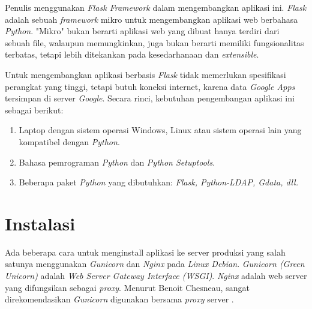 Penulis menggunakan \textit{Flask Framework} dalam mengembangkan aplikasi ini. \textit{Flask} adalah sebuah \textit{framework} mikro untuk mengembangkan aplikasi web berbahasa \textit{Python}. "Mikro" bukan berarti aplikasi web yang dibuat hanya terdiri dari sebuah file, walaupun memungkinkan, juga bukan berarti memiliki fungsionalitas terbatas, tetapi lebih ditekankan pada kesedarhanaan  dan \textit{extensible}.

Untuk mengembangkan aplikasi berbasis \textit{Flask} tidak memerlukan spesifikasi perangkat yang tinggi, tetapi butuh koneksi internet, karena data \textit{Google Apps} tersimpan di server \textit{Google}. Secara rinci, kebutuhan pengembangan aplikasi ini sebagai berikut:

\begin{enumerate}[itemsep=-1ex]
\item Laptop dengan sistem operasi Windows, Linux atau sistem operasi lain yang kompatibel dengan \textit{Python}.
\item Bahasa pemrograman \textit{Python} dan \textit{Python Setuptools}.
\item Beberapa paket \textit{Python} yang dibutuhkan: \textit{Flask, Python-LDAP, Gdata, dll.}
\end{enumerate}

%

\section{Instalasi}

Ada beberapa cara untuk menginstall aplikasi ke server produksi yang salah satunya menggunakan \textit{Gunicorn} dan \textit{Nginx} pada \textit{Linux Debian}. \textit{Gunicorn (Green Unicorn)} adalah \textit{Web Server Gateway Interface (WSGI)}. \textit{Nginx} adalah web server yang difungsikan sebagai \textit{proxy}. Menurut Benoit Chesneau, sangat direkomendasikan \textit{Gunicorn} digunakan bersama \textit{proxy} server \cite{benoit2012}.
